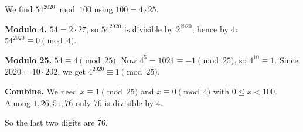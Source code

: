 We find $54^{2020}\bmod 100$ using $100=4\cdot25$.

\textbf{Modulo 4.} $54=2\cdot27$, so $54^{2020}$ is divisible by $2^{2020}$, hence by $4$: $54^{2020}\equiv0\pmod 4$.

\textbf{Modulo 25.} $54\equiv4\pmod{25}$. Now $4^5=1024\equiv-1\pmod{25}$, so $4^{10}\equiv1$. Since $2020=10\cdot202$, we get $4^{2020}\equiv1\pmod{25}$.

\textbf{Combine.} We need $x\equiv1\pmod{25}$ and $x\equiv0\pmod4$ with $0\le x<100$. Among $1,26,51,76$ only $76$ is divisible by $4$.

So the last two digits are $\boxed{76}$.
